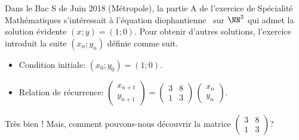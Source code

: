 Dans le Bac S de Juin 2018 (Métropole), la partie A de l'exercice de Spécialité Mathématiques s'intéressait à l'équation diophantienne \ED\ sur $\NN^2$ qui admet la solution évidente $(x ; y) = (1 ; 0)$.
%
Pour obtenir d'autres solutions, l'exercice introduit la suite $(x_n ; y_n)$ définie comme suit.
%
\begin{itemize}
    \item Condition initiale: $(x_0 ; y_0) = (1 ; 0)$.

    \item Relation de récurrence:
$\begin{pmatrix} 
  x_{n+1} \\ 
  y_{n+1} 
\end{pmatrix}
=
\begin{pmatrix} 
  3 & 8  \\ 
  1 & 3 
\end{pmatrix}
\,
\begin{pmatrix} 
  x_{n} \\ 
  y_{n} 
\end{pmatrix}
$.

\end{itemize}

Très bien ! Mais, comment pouvons-nous découvrir la matrice 
$\begin{pmatrix} 
  3 & 8  \\ 
  1 & 3 
\end{pmatrix}
$?